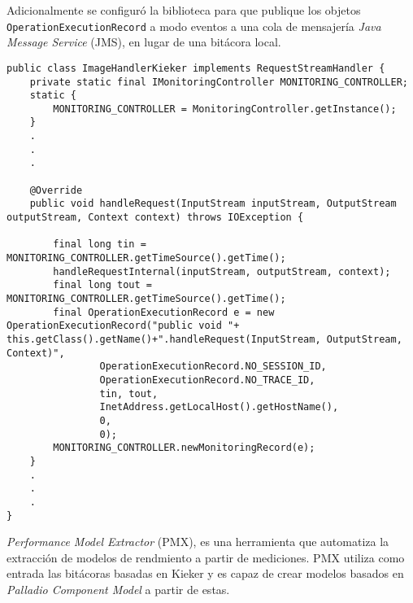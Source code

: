 Adicionalmente se configuró la biblioteca para que publique los objetos\\ \texttt{OperationExecutionRecord} a modo eventos a una cola de mensajería \emph{Java Message Service} (JMS), en lugar de una bitácora local.

\begin{lstlisting}[caption={Extracto de la clase \texttt{ImageHandler.java} instrumentalizada con Kieker}, label={lst:image-handler-kieker}]
public class ImageHandlerKieker implements RequestStreamHandler {
    private static final IMonitoringController MONITORING_CONTROLLER;
    static {
        MONITORING_CONTROLLER = MonitoringController.getInstance();
    }
    .
    .
    .
    
    @Override
    public void handleRequest(InputStream inputStream, OutputStream outputStream, Context context) throws IOException {

        final long tin = MONITORING_CONTROLLER.getTimeSource().getTime();
        handleRequestInternal(inputStream, outputStream, context);
        final long tout = MONITORING_CONTROLLER.getTimeSource().getTime();
        final OperationExecutionRecord e = new OperationExecutionRecord("public void "+ this.getClass().getName()+".handleRequest(InputStream, OutputStream, Context)",
                OperationExecutionRecord.NO_SESSION_ID,
                OperationExecutionRecord.NO_TRACE_ID,
                tin, tout,
                InetAddress.getLocalHost().getHostName(),
                0,
                0);
        MONITORING_CONTROLLER.newMonitoringRecord(e);
    }
    .
    .
    .
}    
\end{lstlisting}


\emph{Performance Model Extractor} (PMX), es una herramienta que automatiza la extracción de modelos de rendmiento a partir de mediciones. PMX utiliza como entrada las bitácoras basadas en Kieker y es capaz de crear modelos basados en \emph{Palladio Component Model} a partir de estas. 


%

